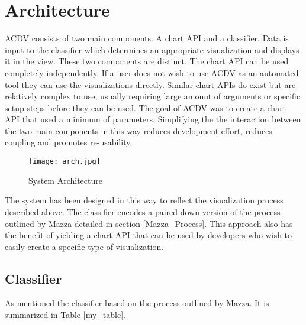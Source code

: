 \documentclass[a4paper, 11pt, titlepage, onehalfspacing]{report}
\begin{document}
\section{Architecture}
AC\lightning{}DV consists of two main components. A chart API and a classifier. Data is input to the classifier which determines an appropriate visualization and displays it in the view. These two components are distinct. The chart API can be used completely independently. If a user does not wish to use AC\lightning{}DV as an automated tool they can use the visualizations directly. Similar chart APIs do exist \cite{dcjs} but are relatively complex to use, usually requiring large amount of arguments or specific setup steps before they can be used. The goal of AC\lightning{}DV was to create a chart API that used a minimum of parameters. Simplifying the the interaction between the two main components in this way reduces development effort, reduces coupling and promotes re-usability.

\begin{figure}[htp] \centering
\texttt{[image: arch.jpg]}
\caption{System Architecture}
\label{fingal1}
\end{figure}



The system has been designed in this way to reflect the visualization process described above. The classifier encodes a paired down version of the process outlined by Mazza detailed in section \ref{Mazza_Process}. This approach also has the benefit of yielding a chart API that can be used by developers who wish to easily create a specific type of visualization.

\subsection{Classifier}
As mentioned the classifier based on the process outlined by Mazza. It is summarized in Table \ref{my_table}.
\end{document}
